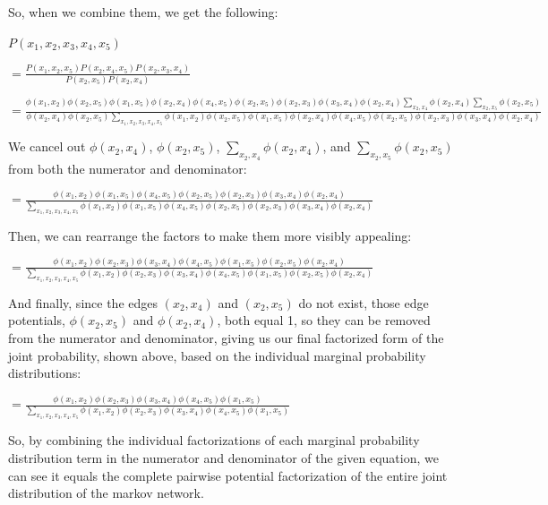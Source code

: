 \documentclass[12pt]{article}
\begin{document}
So, when we combine them, we get the following:

$P(x_1, x_2, x_3, x_4, x_5)$

$= \frac{P(x_1, x_2, x_5)P(x_2, x_4, x_5)P(x_2, x_3, x_4)}{P(x_2, x_5)P(x_2, x_4)}$

$= \frac{\phi(x_1, x_2)\phi(x_2, x_5)\phi(x_1, x_5)\phi(x_2, x_4)\phi(x_4, x_5)\phi(x_2, x_5)\phi(x_2, x_3)\phi(x_3, x_4)\phi(x_2, x_4)\sum_{x_2, x_4} \phi(x_2, x_4) \sum_{x_2, x_5} \phi(x_2, x_5)}{\phi(x_2, x_4)\phi(x_2, x_5)\sum_{x_1, x_2, x_3, x_4, x_5} \phi(x_1, x_2)\phi(x_2, x_5)\phi(x_1, x_5)\phi(x_2, x_4)\phi(x_4, x_5)\phi(x_2, x_5)\phi(x_2, x_3)\phi(x_3, x_4)\phi(x_2, x_4)}$

We cancel out $\phi(x_2, x_4)$, $\phi(x_2, x_5)$, $\sum_{x_2, x_4} \phi(x_2, x_4)$, and $\sum_{x_2, x_5} \phi(x_2, x_5)$ from both the numerator and denominator:

$= \frac{\phi(x_1, x_2)\phi(x_1, x_5)\phi(x_4, x_5)\phi(x_2, x_5)\phi(x_2, x_3)\phi(x_3, x_4)\phi(x_2, x_4)}{\sum_{x_1, x_2, x_3, x_4, x_5} \phi(x_1, x_2)\phi(x_1, x_5)\phi(x_4, x_5)\phi(x_2, x_5)\phi(x_2, x_3)\phi(x_3, x_4)\phi(x_2, x_4)}$

Then, we can rearrange the factors to make them more visibly appealing:

$= \frac{\phi(x_1, x_2)\phi(x_2, x_3)\phi(x_3, x_4)\phi(x_4, x_5)\phi(x_1, x_5)\phi(x_2, x_5)\phi(x_2, x_4)}{\sum_{x_1, x_2, x_3, x_4, x_5} \phi(x_1, x_2)\phi(x_2, x_3)\phi(x_3, x_4)\phi(x_4, x_5)\phi(x_1, x_5)\phi(x_2, x_5)\phi(x_2, x_4)}$

And finally, since the edges $(x_2, x_4)$ and $(x_2, x_5)$ do not exist, those edge potentials, $\phi(x_2, x_5)$ and $\phi(x_2, x_4)$, both equal 1, so they can be removed from the numerator and denominator, giving us our final factorized form of the joint probability, shown above, based on the individual marginal probability distributions:

$= \frac{\phi(x_1, x_2)\phi(x_2, x_3)\phi(x_3, x_4)\phi(x_4, x_5)\phi(x_1, x_5)}{\sum_{x_1, x_2, x_3, x_4, x_5} \phi(x_1, x_2)\phi(x_2, x_3)\phi(x_3, x_4)\phi(x_4, x_5)\phi(x_1, x_5)}$

So, by combining the individual factorizations of each marginal probability distribution term in the numerator and denominator of the given equation, we can see it equals the complete pairwise potential factorization of the entire joint distribution of the markov network.
\end{document}
